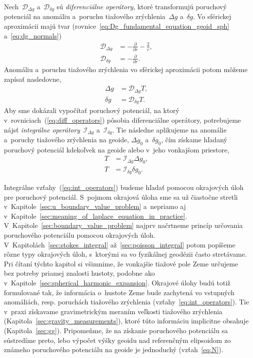 \documentclass[a4paper, 12pt]{book}
\newcommand{\DIFF}{\mathcal D}
\newcommand{\INT}{\mathcal I}
\begin{document}
Nech~$\DIFF_{\Delta g}$ a~$\DIFF_{\delta g}$ sú \emph{diferenciálne operátory}, 
ktoré transformujú poruchový potenciál na anomáliu a~poruchu tiažového 
zrýchlenia~$\Delta g$ a~$\delta g$.  Vo sférickej aproximácii majú tvar 
(rovnice~\ref{eq:Dg_fundamental_equation_geoid_sph} a~\ref{eq:dg_normals})
%
\begin{equation}
\label{eq:diff_Dg}
\begin{split}
\DIFF_{\Delta g} &= -\frac{\partial}{\partial r} - \frac{2}{r}{,}\\
%
\DIFF_{\delta g} &= -\frac{\partial}{\partial r}{.}
\end{split}
\end{equation}
%
Anomáliu a~poruchu tiažového zrýchlenia vo sférickej aproximácii potom môžeme 
zapísať nasledovne,
%
\begin{equation}
\label{eq:diff_operators}
\begin{split}
\Delta g &= \DIFF_{\Delta g}T{,}\\
%
\delta g &= \DIFF_{\delta g}T{.}
\end{split}
\end{equation}
%
Aby sme dokázali vypočítať poruchový potenciál, na ktorý 
v~rovniciach~(\ref{eq:diff_operators}) pôsobia diferenciálne operátory, 
potrebujeme nájsť \emph{integrálne operátory}~$\INT_{\Delta g}$ a~$\INT_{\delta 
g}$.  Tie následne aplikujeme na anomálie a~poruchy tiažového zrýchlenia na 
geoide, $\Delta g_0$ a~$\delta g_0$, čím získame hľadaný poruchový potenciál 
kdekoľvek na geoide alebo v~jeho vonkajšom priestore,
%
\begin{equation}
\label{eq:int_operators}
\begin{split}
T &= \INT_{\Delta g} \Delta g_0{,}\\
%
T &= \INT_{\delta g}\delta g_0{.}
\end{split}
\end{equation}

Integrálne vzťahy~(\ref{eq:int_operators}) budeme hľadať pomocou okrajových 
úloh pre poruchový potenciál.  S~pojmom okrajová úloha sme sa už čiastočne 
stretli v~Kapitole~\ref{sec:u_boundary_value_problem} a~nepriamo aj 
v~Kapitole~\ref{sec:meaning_of_laplace_equation_in_practice}.  
V~Kapitole~\ref{sec:boundary_value_problem} najprv načrtneme princíp určovania 
poruchového potenciálu pomocou okrajových úloh.  
V~Kapitolách~\ref{sec:stokes_integral} až~\ref{sec:poisson_integral} potom 
popíšeme rôzne typy okrajových úloh, s~ktorými sa vo fyzikálnej geodézii často 
stretávame.  Pri čítaní týchto kapitol si všimnime, že vonkajšie tiažové pole 
Zeme určujeme bez potreby priamej znalosti hustoty, podobne ako 
v~Kapitole~\ref{sec:spherical_harmonic_expansion}.  Okrajové úlohy budú totiž 
formulované tak, že informácia o~hustote Zeme bude zachytená vo vstupných 
anomáliách, resp. poruchách tiažového zrýchlenia 
(vzťahy~\ref{eq:int_operators}).  Tie v~praxi získavame gravimetrickým meraním 
veľkosti tiažového zrýchlenia (Kapitola~\ref{sec:gravity_measurements}), ktoré 
túto informáciu implicitne obsahuje (Kapitola~\ref{sec:gg}).  Pripomeňme, že na 
získanie poruchového potenciálu sa sústredíme preto, lebo výpočet výšky geoidu 
nad referenčným elipsoidom zo známeho poruchového potenciálu na geoide je 
jednoduchý (vzťah~\ref{eq:N}).
\end{document}
